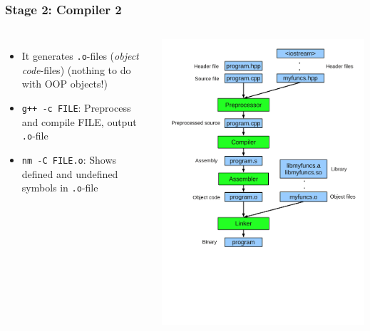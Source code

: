 \documentclass{slides}
\begin{document}
\begin{frame}[fragile]
  \frametitle{Stage 2: Compiler 2}
  \begin{columns}[T,onlytextwidth]
  \begin{itemize}
  \item It generates \lstinline!.o!-files (\emph{object
      code}-files) (nothing to do with OOP objects!)
  \item \lstinline!g++ -c FILE!: Preprocess and compile FILE, output
    \lstinline!.o!-file
  \item \lstinline!nm -C FILE.o!: Shows defined and undefined symbols
    in \lstinline!.o!-file
  \end{itemize}
    \includegraphics[height=1.1\textheight]{compilation}
  \end{columns}
\end{frame}
\end{document}
